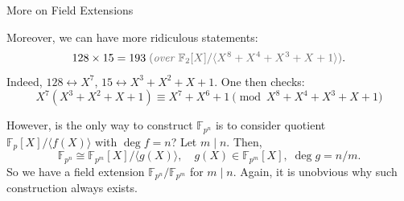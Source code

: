 \documentclass{zkdl-presentation-template}
\begin{document}
    \begin{frame}{More on Field Extensions}
        \begin{example}
            Moreover, we can have more ridiculous statements:
            \begin{equation*}
                128 \times 15 = 193 \; \textcolor{gray!75!black}{(\textit{over $\mathbb{F}_2[X] / \langle X^8+X^4+X^3+X+1 \rangle$})}.
            \end{equation*}
            Indeed, $128 \leftrightarrow X^7$, $15 \leftrightarrow
            X^3+X^2+X+1$. One then checks:
            \begin{equation*}
                X^7(X^3+X^2+X+1) \equiv X^7+X^6+1 \pmod{X^8+X^4+X^3+X+1}
            \end{equation*}
        \end{example}

        However, is the only way to construct $\mathbb{F}_{p^n}$ is to consider
        quotient $\mathbb{F}_p[X]/\langle f(X) \rangle$ with $\deg f = n$? Let $m \mid n$. Then,
        \begin{equation*}
            \mathbb{F}_{p^n} \cong \mathbb{F}_{p^m}[X] / \langle g(X) \rangle, \quad g(X) \in \mathbb{F}_{p^m}[X], \; \deg g = n/m.
        \end{equation*}
        So we have a field extension $\mathbb{F}_{p^n}/\mathbb{F}_{p^m}$ for $m
        \mid n$. Again, it is unobvious why such construction always exists.
    \end{frame}
\end{document}
